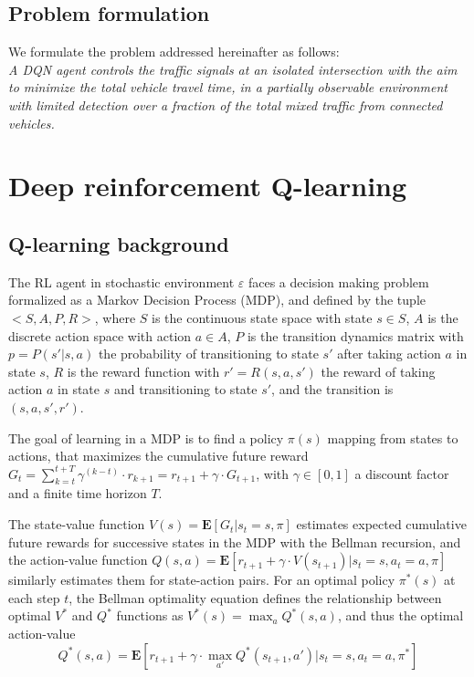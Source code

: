 \documentclass[journal]{IEEEtran}
\begin{document}
\subsection{Problem formulation}
We formulate the problem addressed hereinafter as follows: \\
\textit{A DQN agent controls the traffic signals at an isolated intersection with the aim to minimize the total vehicle travel time, in a partially observable environment with limited detection over a fraction of the total mixed traffic from connected vehicles.}

\section{Deep reinforcement Q-learning}
\label{sec:dqn}

\subsection{Q-learning background}
The RL agent in stochastic environment $\varepsilon$ faces a decision making problem formalized as a Markov Decision Process (MDP), and defined by the tuple $<S,A,P,R>$, where $S$ is the continuous state space with state $s \in S$, $A$ is the discrete action space with action $a \in A$, $P$ is the transition dynamics matrix with $p=P(s'|s,a)$ the probability of transitioning to state $s'$ after taking action $a$ in state $s$, $R$ is the reward function with $r'=R(s,a,s')$ the reward of taking action $a$ in state $s$ and transitioning to state $s'$, and the transition is $(s,a,s',r')$.

The goal of learning in a MDP is to find a policy $\pi(s)$ mapping from states to actions, that maximizes the cumulative future reward $G_t = \sum_{k=t}^{t+T} \gamma^{(k-t)} \cdot r_{k+1} = r_{t+1} + \gamma \cdot G_{t+1}$, with $\gamma \in [0,1]$ a discount factor and a finite time horizon $T$.
    
The state-value function $V(s) = \mathbf{E}[G_{t} |s_t=s, \pi]$ estimates expected cumulative future rewards for successive states in the MDP with the Bellman recursion, and the action-value function $Q(s,a)= \mathbf{E}[r_{t+1} + \gamma \cdot V(s_{t+1}) |s_t=s, a_t=a, \pi]$ similarly estimates them for state-action pairs. For an optimal policy $\pi^*(s)$ at each step $t$, the Bellman optimality equation defines the relationship between optimal $V^*$ and $Q^*$ functions as $V^*(s) = \max_a Q^*(s,a)$, and thus the optimal action-value
\[ Q^*(s,a) = \mathbf{E}[r_{t+1} + \gamma \cdot \max_{a'}Q^*(s_{t+1},a')|s_t=s,a_t=a,\pi^*] \]
\end{document}
